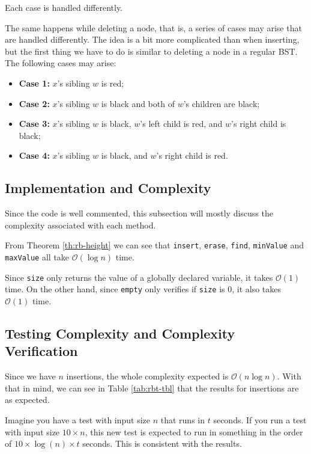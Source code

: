 \documentclass[12pt,a4paper,oneside]{article}
\theoremstyle{definition}
\begin{document}
Each case is handled differently.

The same happens while deleting a node, that is, a series of cases may arise that are handled differently. The idea is a bit more complicated than when inserting, but the first thing we have to do is similar to deleting a node in a regular BST. The following cases may arise:

\begin{itemize}
	\item \textbf{Case 1:} $x$'s sibling $w$ is red;
	\item \textbf{Case 2:} $x$'s sibling $w$ is black and both of $w$'s children are black;
	\item \textbf{Case 3:} $x$'s sibling $w$ is black, $w$'s left child is red, and $w$'s right child is black;
	\item \textbf{Case 4:} $x$'s sibling $w$ is black, and $w$'s right child is red.
\end{itemize}


\subsection{Implementation and Complexity}\label{subsec:rb-impl}

Since the code is well commented, this subsection will mostly discuss the complexity associated with each method.

From Theorem \ref{th:rb-height} we can see that \texttt{insert}, \texttt{erase}, \texttt{find}, \texttt{minValue} and \texttt{maxValue} all take $\mathcal{O} \left( \log n \right)$ time.

Since \texttt{size} only returns the value of a globally declared variable, it takes $\mathcal{O} \left( 1 \right)$ time. On the other hand, since \texttt{empty} only verifies if \texttt{size} is $0$, it also takes $\mathcal{O} \left( 1 \right)$ time.

\subsection{Testing Complexity and Complexity Verification}\label{subsec:rb-tst}

Since we have $n$ insertions, the whole complexity expected is $\mathcal{O} \left( n \log n \right)$. With that in mind, we can see in Table \ref{tab:rbt-tbl} that the results for insertions are as expected.

Imagine you have a test with input size $n$ that runs in $t$ seconds. If you run a test with input size $10 \times n$, this new test is expected to run in something in the order of $10 \times \log \left( n \right) \times t$ seconds. This is consistent with the results.
\end{document}
